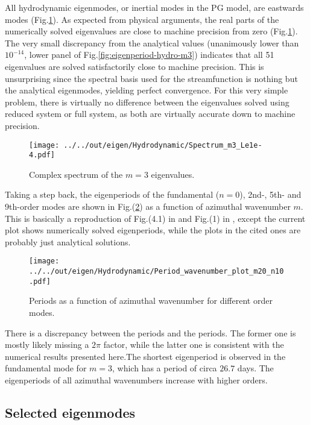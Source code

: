 All hydrodynamic eigenmodes, or inertial modes in the PG model, are eastwards modes (Fig.\ref{fig:complex-spectrum-hydro-m3}). As expected from physical arguments, the real parts of the numerically solved eigenvalues are close to machine precision from zero (Fig.\ref{fig:complex-spectrum-hydro-m3}).
The very small discrepancy from the analytical values (unanimously lower than $10^{-14}$, lower panel of Fig.\ref{fig:eigenperiod-hydro-m3}) indicates that all 51 eigenvalues are solved satisfactorily close to machine precision.
This is unsurprising since the spectral basis used for the streamfunction is nothing but the analytical eigenmodes, yielding perfect convergence. For this very simple problem, there is virtually no difference between the eigenvalues solved using reduced system or full system, as both are virtually accurate down to machine precision.
\begin{figure}[htbp]
    \centering
    \texttt{[image: ../../out/eigen/Hydrodynamic/Spectrum\_m3\_Le1e-4.pdf]}
    \caption{Complex spectrum of the $m=3$ eigenvalues.}
    \label{fig:complex-spectrum-hydro-m3}
\end{figure}

Taking a step back, the eigenperiods of the fundamental ($n=0$), 2nd-, 5th- and 9th-order modes are shown in Fig.(\ref{fig:period-m-hydro}) as a function of azimuthal wavenumber $m$.
This is basically a reproduction of Fig.(4.1) in \textcite{holdenried-chernoff_long_2021} and Fig.(1) in \textcite{jackson_plesio-geostrophy_2020}, except the current plot shows numerically solved eigenperiods, while the plots in the cited ones are probably just analytical solutions.
\begin{figure}[htbp]
    \centering
    \texttt{[image: ../../out/eigen/Hydrodynamic/Period\_wavenumber\_plot\_m20\_n10.pdf]}
    \caption{Periods as a function of azimuthal wavenumber for different order modes.}
    \label{fig:period-m-hydro}
\end{figure}

There is a discrepancy between the \textcite{jackson_plesio-geostrophy_2020} periods and the \textcite{holdenried-chernoff_long_2021} periods. The former one is mostly likely missing a $2\pi$ factor, while the latter one is consistent with the numerical results presented here.The shortest eigenperiod is observed in the fundamental mode for $m=3$, which has a period of circa $26.7$ days. The eigenperiods of all azimuthal wavenumbers increase with higher orders. 


\subsection{Selected eigenmodes}

